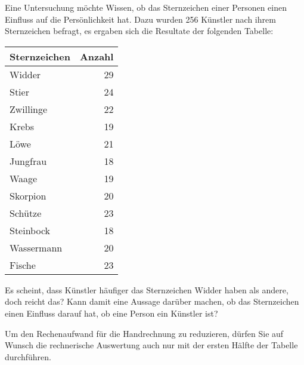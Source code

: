 Eine Untersuchung möchte Wissen, ob das Sternzeichen einer
Personen einen Einfluss auf die Persönlichkeit hat.
Dazu wurden 256 Künstler nach ihrem Sternzeichen befragt,
es ergaben sich die Resultate der folgenden Tabelle:
\begin{center}
\begin{tabular}{|l|r|}
\hline
Sternzeichen & Anzahl \\
\hline
Widder     & 29 \\
Stier      & 24 \\
Zwillinge  & 22 \\
Krebs      & 19 \\
Löwe       & 21 \\
Jungfrau   & 18 \\
Waage      & 19 \\
Skorpion   & 20 \\
Schütze    & 23 \\
Steinbock  & 18 \\
Wassermann & 20 \\
Fische     & 23 \\
\hline
\end{tabular}
\end{center}
Es scheint, dass Künstler häufiger das Sternzeichen Widder
haben als andere, doch reicht das?
Kann damit eine Aussage darüber machen, ob das Sternzeichen einen
Einfluss darauf hat, ob eine Person ein Künstler ist?

\begin{hinweis}
Um den Rechenaufwand für die Handrechnung zu reduzieren, dürfen Sie
auf Wunsch die rechnerische Auswertung auch nur mit der ersten Hälfte
der Tabelle durchführen.
\end{hinweis}

